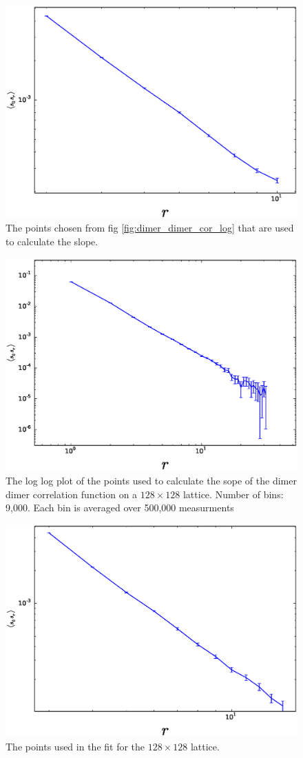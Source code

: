 \documentclass[aps,floatfix,11pt]{revtex4-1}
\begin{document}
\begin{figure}[h]
    \centering
    \includegraphics[width=8.5 cm]{fit_dm_dm_horz_ln_pnts_64x64}
    \caption{The points chosen from fig \ref{fig:dimer_dimer_cor_log} that are used to calculate the
    slope.\label{fig:fit_dm_dm_64x64}}
\end{figure}

\begin{figure}[h]
    \centering
    \includegraphics[width=8.5 cm]{dimer_dimer_cor_log_128x128}
    \caption{The log log plot of the points used to calculate the sope of the dimer dimer
        correlation function on a $128\times 128$ lattice. Number of bins: 9,000. Each bin is
    averaged over 500,000 measurments\label{fig:dimer_dimer_cor_log_128x128}}
\end{figure}

\begin{figure}[h]
    \centering
    \includegraphics[width=8.5 cm]{fit_dm_dm_horz_ln_pnts_128x128}
    \caption{The points used in the fit for the $128\times128$ lattice.\label{fig:fit_dm_dm_128x128}}
\end{figure}
\end{document}
